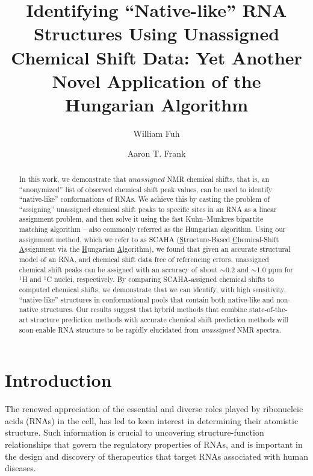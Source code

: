 \documentclass[journal=jcisd8,manuscript=article,layout=onecolumn]{achemso}
\author{William Fuh}
\author{Aaron T. Frank}
\affiliation{Departments of Biophysics and Chemistry, University of Michigan, 930 North University Avenue, Ann Arbor, Michigan 48109, USA}
\title[Title]
 {Identifying ``Native-like'' RNA Structures Using Unassigned Chemical Shift Data: Yet Another Novel Application of the Hungarian Algorithm}
\begin{document}
\begin{abstract}
In this work, we demonstrate that $\textit{unassigned}$ NMR chemical shifts, that is, an  ``anonymized'' list of observed chemical shift peak values, can be used to identify ``native-like'' conformations of RNAs.  We achieve this by casting the problem of ``assigning''  unassigned chemical shift peaks to specific sites in an RNA as a linear assignment problem, and then solve it using the fast Kuhn--Munkres  bipartite matching algorithm -- also commonly referred as the Hungarian algorithm. Using our assignment method, which we refer to as SCAHA (\underline{S}tructure-Based \underline{C}hemical-Shift \underline{A}ssignment via the \underline{H}ungarian \underline{A}lgorithm), we found that given an accurate structural model of an RNA, and chemical shift data free of referencing errors, unassigned chemical shift peaks can be assigned with an accuracy of about $\sim$0.2 and $\sim$1.0 ppm for $^{1}$H and  $^{1}$C nuclei, respectively.  By comparing SCAHA-assigned chemical shifts to computed chemical shifts, we demonstrate that we can identify, with high sensitivity, “native-like” structures in conformational pools that contain both native-like and non-native structures. Our results suggest that hybrid methods that combine state-of-the-art structure prediction methods with accurate chemical shift prediction methods will soon enable RNA structure to be rapidly elucidated from \textit{unassigned} NMR spectra.
\end{abstract}
 
\section{Introduction}
The renewed appreciation of the essential and diverse roles played by ribonucleic acids (RNAs) in the cell\cite{encode2012integrated}, has led to keen interest in determining their atomistic structure. Such information is crucial to uncovering structure-function relationships that govern the regulatory properties of RNAs, and is important in the design and discovery of therapeutics that target RNAs associated with human diseases\cite{cooper2009rna}. 
\end{document}
